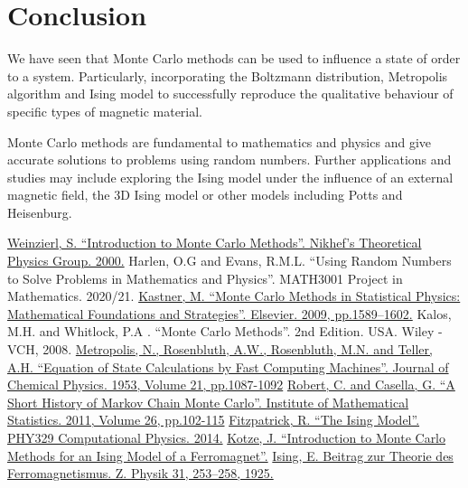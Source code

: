 \documentclass[a4paper]{article}
\begin{document}
\section{Conclusion}
We have seen that Monte Carlo methods can be used to influence a state of order to a system. Particularly, incorporating the Boltzmann distribution, Metropolis algorithm and Ising model to successfully reproduce the qualitative behaviour of specific types of magnetic material. 

Monte Carlo methods are fundamental to mathematics and physics and give accurate solutions to problems using random numbers. Further applications and studies may include exploring the Ising model under the influence of an external magnetic field, the 3D Ising model or other models including Potts and Heisenburg. 

\begin{thebibliography}{5}
\href{https://arxiv.org/pdf/hep-ph/0006269.pdf}{Weinzierl, S. “Introduction to Monte Carlo Methods”. Nikhef's Theoretical Physics Group. 2000.}
 Harlen, O.G and Evans, R.M.L. “Using Random Numbers to Solve Problems in Mathematics and Physics”. MATH3001 Project in Mathematics. 2020/21.
 \href{https://reader.elsevier.com/reader/sd/pii/S1007570409003517?token=5C265B5A35134BF073C921936D14B965297B5F00FF3AD6194363AD5D2764B57E4814ED5B647AAE9FBBC7C44F5601547E}{Kastner, M. “Monte Carlo Methods in Statistical Physics: Mathematical Foundations and Strategies”. Elsevier. 2009, pp.1589–1602.}
 Kalos, M.H. and Whitlock, P.A . “Monte Carlo Methods”. 2nd Edition. USA. Wiley - VCH, 2008.
\href{https://bayes.wustl.edu/Manual/EquationOfState.pdf}{Metropolis, N., Rosenbluth, A.W., Rosenbluth, M.N. and Teller, A.H. “Equation of State Calculations by Fast Computing Machines”. Journal of Chemical Physics. 1953, Volume 21, pp.1087-1092}
\href{https://arxiv.org/pdf/0808.2902.pdf}{Robert, C. and Casella, G. “A Short History of Markov Chain Monte Carlo”. Institute of Mathematical Statistics. 2011, Volume 26, pp.102-115}
\href{http://farside.ph.utexas.edu/teaching/329/lectures}{Fitzpatrick, R. “The Ising Model”. PHY329 Computational Physics. 2014.}
 \href{https://arxiv.org/pdf/0803.0217.pdf}{Kotze, J. “Introduction to Monte Carlo Methods for an Ising Model of a Ferromagnet”.}
 \href{https://link.springer.com/article/10.1007/BF02980577}{Ising, E. Beitrag zur Theorie des Ferromagnetismus. Z. Physik 31, 253–258, 1925.}
\end{thebibliography}
\end{document}
